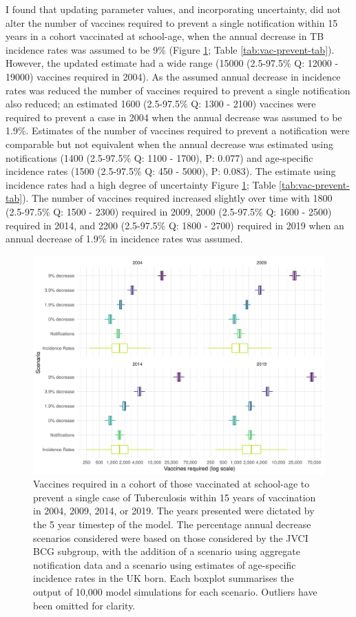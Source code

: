 \documentclass[11pt,twoside]{bristolthesis}
\begin{document}
  I found that updating parameter values, and incorporating uncertainty, did not alter the number of vaccines required to prevent a single notification within 15 years in a cohort vaccinated at school-age, when the annual decrease in TB incidence rates was assumed to be 9\% (Figure \ref{fig:graph-vacs-to-prev}; Table \ref{tab:vac-prevent-tab}). However, the updated estimate had a wide range (15000 (2.5-97.5\% Q: 12000 - 19000) vaccines required in 2004). As the assumed annual decrease in incidence rates was reduced the number of vaccines required to prevent a single notification also reduced; an estimated 1600 (2.5-97.5\% Q: 1300 - 2100) vaccines were required to prevent a case in 2004 when the annual decrease was assumed to be 1.9\%. Estimates of the number of vaccines required to prevent a notification were comparable but not equivalent when the annual decrease was estimated using notifications (1400 (2.5-97.5\% Q: 1100 - 1700), P: 0.077) and age-specific incidence rates (1500 (2.5-97.5\% Q: 450 - 5000), P: 0.083). The estimate using incidence rates had a high degree of uncertainty Figure \ref{fig:graph-vacs-to-prev}; Table \ref{tab:vac-prevent-tab}). The number of vaccines required increased slightly over time with 1800 (2.5-97.5\% Q: 1500 - 2300) required in 2009, 2000 (2.5-97.5\% Q: 1600 - 2500) required in 2014, and 2200 (2.5-97.5\% Q: 1800 - 2700) required in 2019 when an annual decrease of 1.9\% in incidence rates was assumed.
  \begin{figure}
  
  {\centering \includegraphics[width=0.8\linewidth]{chapters/evidence-policy-change/graph-vacs-to-prev-1} 
  
  }
  
  \caption{Vaccines required in a cohort of those vaccinated at school-age to prevent a single case of Tuberculosis within 15 years of vaccination in 2004, 2009, 2014, or 2019. The years presented were dictated by the 5 year timestep of the model. The percentage annual decrease scenarios considered were based on those considered by the JVCI BCG subgroup, with the addition of a scenario using aggregate notification data and a scenario using estimates of age-specific incidence rates in the UK born. Each boxplot summarises the output of 10,000 model simulations for each scenario. Outliers have been omitted for clarity.}\label{fig:graph-vacs-to-prev}
  \end{figure}
\end{document}
